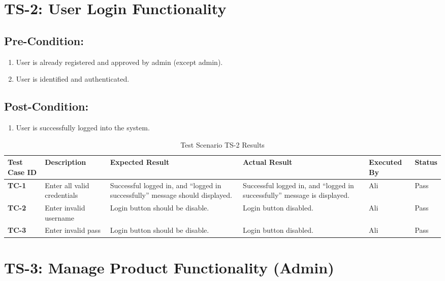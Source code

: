 \section{TS-2: User Login Functionality}
\subsection{Pre-Condition:}
\begin{enumerate}
  \item User is already registered and approved by admin (except admin).
  \item User is identified and authenticated.
\end{enumerate}
\subsection{Post-Condition:}
\begin{enumerate}
  \item User is successfully logged into the system.
\end{enumerate}

\begin{table}[H]
    \centering
   \begin{tabular}{ | m{1cm} | m{2.3cm}| m{2cm} | m{2cm} | m{1.7cm} | m{1.3cm} |}  
  \hline  \textbf{Test Case ID} &  \textbf{Description} &  \textbf{Expected Result} &  \textbf{Actual Result} &  \textbf{Executed By} &  \textbf{Status}  \\  \hline
  \textbf{TC-1} & Enter all valid credentials & Successful logged in, and “logged in successfully” message should displayed. & Successful logged in, and “logged in successfully” message is displayed. & Ali & Pass
  \\  \hline
  \textbf{TC-2} & Enter invalid username & Login button should be disable. & Login button disabled. & Ali & Pass
  \\  \hline
  \textbf{TC-3} & Enter invalid pass & Login button should be disable. & Login button disabled. & Ali & Pass
  \\  \hline
  
\end{tabular}
    \caption{Test Scenario TS-2 Results}
    \label{tab: Test Scenario TS-2 Results}
\end{table}

\section{TS-3: Manage Product Functionality (Admin)}
